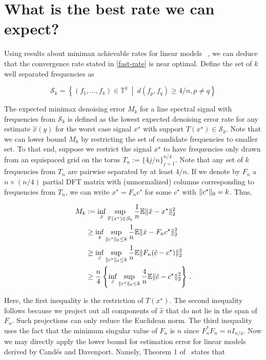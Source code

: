 \section{What is the best rate we can expect?}\label{sec:minimax}

Using results about minimax achievable rates for linear models~
\cite{cd_minimax,rw_minimax}, we can deduce that the convergence rate stated in
\eqref{fast-rate} is near optimal. Define the set of $k$ well separated
frequencies as

\[
\mathcal{S}_k = \left\{(f_1, \dots, f_k) \in \mathbb{T}^k ~\middle|~  d(f_p, f_q) \geq 4/n, p \neq q \right\}
\]

The expected minimax denoising error $M_k$ for a line spectral signal with
frequencies from $\mathcal{S}_k$ is defined as the lowest expected denoising
error rate for any estimate $\hat{x}(y)$ for the worst case signal $x^\star$
with support $T(x^\star) \in \mathcal{S}_k$. Note that we can lower bound $M_k$
by restricting the set of candidate frequencies to smaller set. To that end,
suppose we restrict the signal $x^\star$ to have frequencies only drawn from an
equispaced grid on the torus $T_n := \{ 4 j/n \}_{j=1}^{n/4}$. Note that any set
of $k$ frequencies from $T_n$ are pairwise separated by at least $4/n$. If we
denote by $F_n$ a $n \times (n/4)$ partial DFT matrix with (unnormalized)
columns corresponding to frequencies from $T_n$, we can write $x^\star = F_n
c^\star$ for some $c^\star$ with $\lVert c^\star\rVert_0 = k$. Thus,

\begin{align*}
M_k &:= \inf_{\hat{x}}
 \sup_{
	T(x^\star) \in \mathcal{S}_k}
\frac{1}{n} \mathbb{E} \lVert\hat{x} - x^\star\rVert_2^2
	\\
&\geq \inf_{\hat{x}} 
 \sup_{
	\lVert c^\star\rVert_0 \leq k
	} \frac{1}{n} \mathbb{E} \lVert\hat{x} - F_n c^\star\rVert_2^2\\
&\geq \inf_{\hat{c}}
 \sup_{\lVert c^\star\rVert_0 \leq k} \frac{1}{n} \mathbb{E} \lVert F_n(\hat{c} - c^\star)\rVert_2^2\\
&\geq  \frac{n}{4} \left\{ \inf_{\hat{c}}
 \sup_{\lVert c^\star\rVert_0 \leq k}\frac{4}{n} \mathbb{E} \lVert\hat{c} - c^\star\rVert_2^2\right\}\,.
\end{align*}

Here, the first inequality is the restriction of $T(x^\star)$. The second
inequality follows because we project out all components of $\hat{x}$ that do
not lie in the span of $F_n$. Such projections can only reduce the Euclidean
norm. The third inequality uses the fact that the minimum singular value of
$F_n$ is $n$ since $F_n^*F_n = n I_{{n}/{4}}$. Now we may directly apply the
lower bound for estimation error for linear models derived by Cand\'es and
Davenport. Namely, Theorem 1 of~\cite{cd_minimax} states that

